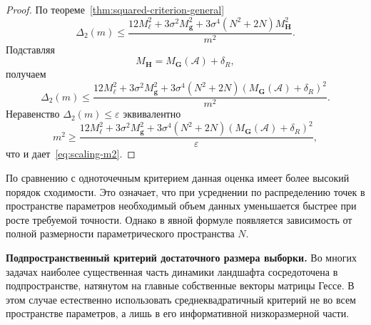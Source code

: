 \begin{proof}
    По теореме~\ref{thm:squared-criterion-general}
    \begin{equation}
        \Delta_2(m)
        \le
        \frac{
            12M_{\ell}^2
            +
            3\sigma^2 M_{\mathbf g}^2
            +
            3\sigma^4(N^2+2N)M_{\mathbf H}^2
        }{m^2}.
    \end{equation}
    Подставляя
    \begin{equation}
        M_{\mathbf H}=M_{\mathbf G}(\mathcal A)+\delta_R,
    \end{equation}
    получаем
    \begin{equation}
        \Delta_2(m)
        \le
        \frac{
            12M_{\ell}^2
            +
            3\sigma^2 M_{\mathbf g}^2
            +
            3\sigma^4(N^2+2N)\left(M_{\mathbf G}(\mathcal A)+\delta_R\right)^2
        }{m^2}.
    \end{equation}
    Неравенство $\Delta_2(m)\le\varepsilon$ эквивалентно
    \begin{equation}
        m^2
        \ge
        \frac{
            12M_{\ell}^2
            +
            3\sigma^2 M_{\mathbf g}^2
            +
            3\sigma^4(N^2+2N)\left(M_{\mathbf G}(\mathcal A)+\delta_R\right)^2
        }{\varepsilon},
    \end{equation}
    что и дает~\eqref{eq:scaling-m2}.
\end{proof}

По сравнению с одноточечным критерием данная оценка имеет более высокий порядок сходимости. Это означает, что при усреднении по распределению точек в пространстве параметров необходимый объем данных уменьшается быстрее при росте требуемой точности. Однако в явной формуле появляется зависимость от полной размерности параметрического пространства $N$.

\textbf{Подпространственный критерий достаточного размера выборки.} Во многих задачах наиболее существенная часть динамики ландшафта сосредоточена в подпространстве, натянутом на главные собственные векторы матрицы Гессе. В этом случае естественно использовать среднеквадратичный критерий не во всем пространстве параметров, а лишь в его информативной низкоразмерной части.

